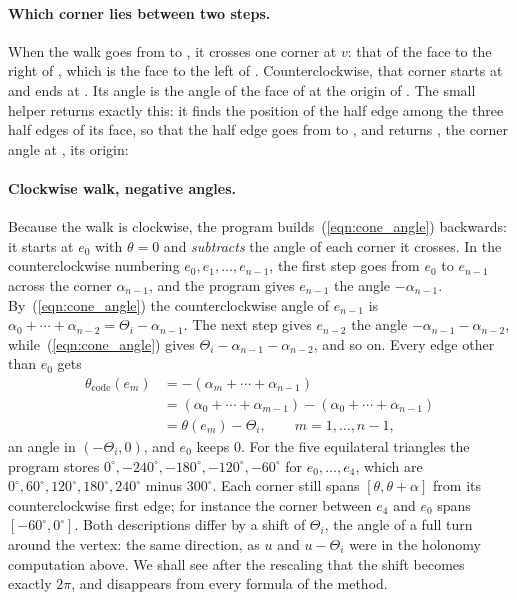 \paragraph{Which corner lies between two steps.} When the walk goes from  to , it crosses one corner at $v$: that of the face to the right of , which is the face to the left of . Counterclockwise, that corner starts at  and ends at . Its angle is the angle of the face of  at the origin of . The small helper  returns exactly this: it finds the position  of the half edge among the three half edges of its face, so that the half edge goes from  to , and returns , the corner angle at , its origin:


\paragraph{Clockwise walk, negative angles.} Because the walk is clockwise, the program builds~(\ref{eqn:cone_angle}) backwards: it starts at $e_0$ with $\theta = 0$ and \emph{subtracts} the angle of each corner it crosses. In the counterclockwise numbering $e_0, e_1, \ldots, e_{n-1}$, the first step goes from $e_0$ to $e_{n-1}$ across the corner $\alpha_{n-1}$, and the program gives $e_{n-1}$ the angle $-\alpha_{n-1}$. By~(\ref{eqn:cone_angle}) the counterclockwise angle of $e_{n-1}$ is $\alpha_0 + \cdots + \alpha_{n-2} = \Theta_i - \alpha_{n-1}$. The next step gives $e_{n-2}$ the angle $-\alpha_{n-1} - \alpha_{n-2}$, while~(\ref{eqn:cone_angle}) gives $\Theta_i - \alpha_{n-1} - \alpha_{n-2}$, and so on. Every edge other than $e_0$ gets
\begin{equation*}
\begin{aligned}
\theta_{\text{code}}(e_m) &= -(\alpha_m + \cdots + \alpha_{n-1}) \\
&= (\alpha_0 + \cdots + \alpha_{m-1}) - (\alpha_0 + \cdots + \alpha_{n-1}) \\
&= \theta(e_m) - \Theta_i , \qquad m = 1, \ldots, n-1,
\end{aligned}
\end{equation*}
an angle in $(-\Theta_i, 0)$, and $e_0$ keeps $0$. For the five equilateral triangles the program stores $0^\circ, -240^\circ, -180^\circ, -120^\circ, -60^\circ$ for $e_0, \ldots, e_4$, which are $0^\circ, 60^\circ, 120^\circ, 180^\circ, 240^\circ$ minus $300^\circ$. Each corner still spans $[\theta, \theta + \alpha]$ from its counterclockwise first edge; for instance the corner between $e_4$ and $e_0$ spans $[-60^\circ, 0^\circ]$. Both descriptions differ by a shift of $\Theta_i$, the angle of a full turn around the vertex: the same direction, as $u$ and $u - \Theta_i$ were in the holonomy computation above. We shall see after the rescaling that the shift becomes exactly $2\pi$, and disappears from every formula of the method.

